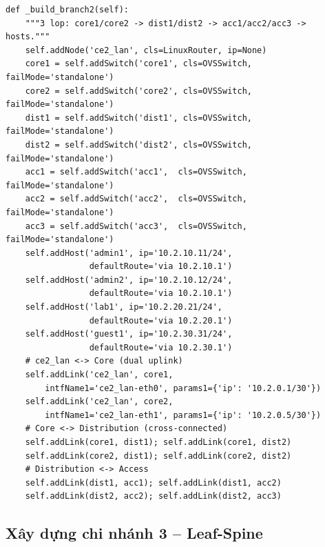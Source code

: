 \begin{lstlisting}[style=pythonstyle, caption={Hàm \_build\_branch2() -- 3-Tier Core-Distribution-Access}]
def _build_branch2(self):
    """3 lop: core1/core2 -> dist1/dist2 -> acc1/acc2/acc3 -> hosts."""
    self.addNode('ce2_lan', cls=LinuxRouter, ip=None)
    core1 = self.addSwitch('core1', cls=OVSSwitch, failMode='standalone')
    core2 = self.addSwitch('core2', cls=OVSSwitch, failMode='standalone')
    dist1 = self.addSwitch('dist1', cls=OVSSwitch, failMode='standalone')
    dist2 = self.addSwitch('dist2', cls=OVSSwitch, failMode='standalone')
    acc1 = self.addSwitch('acc1',  cls=OVSSwitch, failMode='standalone')
    acc2 = self.addSwitch('acc2',  cls=OVSSwitch, failMode='standalone')
    acc3 = self.addSwitch('acc3',  cls=OVSSwitch, failMode='standalone')
    self.addHost('admin1', ip='10.2.10.11/24',
                 defaultRoute='via 10.2.10.1')
    self.addHost('admin2', ip='10.2.10.12/24',
                 defaultRoute='via 10.2.10.1')
    self.addHost('lab1', ip='10.2.20.21/24',
                 defaultRoute='via 10.2.20.1')
    self.addHost('guest1', ip='10.2.30.31/24',
                 defaultRoute='via 10.2.30.1')
    # ce2_lan <-> Core (dual uplink)
    self.addLink('ce2_lan', core1,
        intfName1='ce2_lan-eth0', params1={'ip': '10.2.0.1/30'})
    self.addLink('ce2_lan', core2,
        intfName1='ce2_lan-eth1', params1={'ip': '10.2.0.5/30'})
    # Core <-> Distribution (cross-connected)
    self.addLink(core1, dist1); self.addLink(core1, dist2)
    self.addLink(core2, dist1); self.addLink(core2, dist2)
    # Distribution <-> Access
    self.addLink(dist1, acc1); self.addLink(dist1, acc2)
    self.addLink(dist2, acc2); self.addLink(dist2, acc3)
\end{lstlisting}

\subsection{Xây dựng chi nhánh 3 -- Leaf-Spine}

